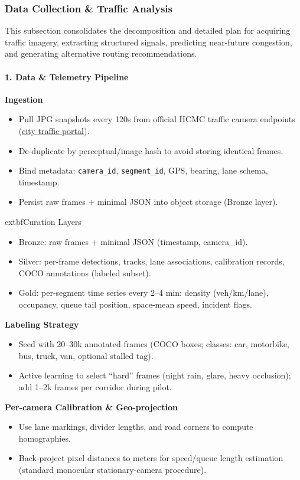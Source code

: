 \subsubsection{Data Collection \& Traffic Analysis}
This subsection consolidates the decomposition and detailed plan for acquiring traffic imagery, extracting structured signals, predicting near-future congestion, and generating alternative routing recommendations.

\paragraph{1. Data \& Telemetry Pipeline}
	\textbf{Ingestion}
\begin{itemize}
  \item Pull JPG snapshots every 120s from official HCMC traffic camera endpoints (\href{https://giaothong.hochiminhcity.gov.vn/Map.aspx}{city traffic portal}).
  \item De-duplicate by perceptual/image hash to avoid storing identical frames.
  \item Bind metadata: \texttt{camera\_id}, \texttt{segment\_id}, GPS, bearing, lane schema, timestamp.
  \item Persist raw frames + minimal JSON into object storage (Bronze layer).
\end{itemize}
      extbf{Curation Layers}
\begin{itemize}
  \item Bronze: raw frames + minimal JSON (timestamp, camera\_id).
  \item Silver: per-frame detections, tracks, lane associations, calibration records, COCO annotations (labeled subset).
  \item Gold: per-segment time series every 2--4 min: density (veh/km/lane), occupancy, queue tail position, space-mean speed, incident flags.
\end{itemize}
	\textbf{Labeling Strategy}
\begin{itemize}
  \item Seed with 20--30k annotated frames (COCO boxes; classes: car, motorbike, bus, truck, van, optional stalled tag).
  \item Active learning to select ``hard'' frames (night rain, glare, heavy occlusion); add 1--2k frames per corridor during pilot.
\end{itemize}
	\textbf{Per-camera Calibration \& Geo-projection}
\begin{itemize}
  \item Use lane markings, divider lengths, and road corners to compute homographies.
  \item Back-project pixel distances to meters for speed/queue length estimation (standard monocular stationary-camera procedure).
\end{itemize}

